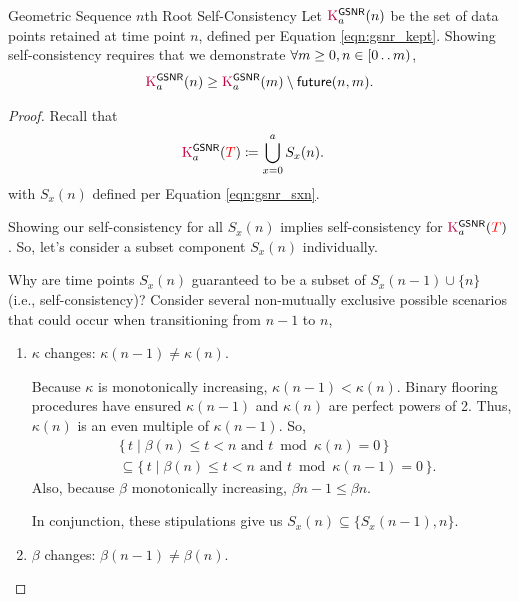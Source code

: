 \begin{theorem}{Geometric Sequence $n$th Root Self-Consistency}
\label{thm:geom-seq-nth-root-algo-self-consistency}
Let $\colorK^{\mathsf{GSNR}}_a(n)$ be the set of data points retained at time point $n$, defined per Equation \ref{eqn:gsnr_kept}.
Showing self-consistency requires that we demonstrate $\forall m \geq 0, n \in [0 \mathinner {\ldotp \ldotp} m)$,
\begin{align*}
\colorK^{\mathsf{GSNR}}_a(n)
\geq
\colorK^{\mathsf{GSNR}}_a(m)
\setminus
\mathsf{future}(n, m).
\end{align*}
\end{theorem}

\begin{proof}
\label{prf:geom-seq-nth-root-algo-self-consistency}
Recall that
\begin{align*}
  \colorK^{\mathsf{GSNR}}_{a}(\colorT)
  &\coloneq
  \bigcup_{x=0}^{a} S_x(n).
\end{align*}
with $S_x(n)$ defined per Equation \ref{eqn:gsnr_sxn}.

Showing our self-consistency for all $S_x(n)$ implies self-consistency for $\colorK^{\mathsf{GSNR}}_a(\colorT)$.
So, let's consider a subset component $S_x(n)$ individually.

Why are time points $S_x(n)$ guaranteed to be a subset of $S_x(n-1) \cup \{n\}$ (i.e., self-consistency)?
Consider several non-mutually exclusive possible scenarios that could occur when transitioning from $n - 1$ to $n$,
\begin{enumerate}
  \item $\kappa$ changes: $\kappa(n - 1) \neq \kappa(n)$.

  Because $\kappa$ is monotonically increasing, $\kappa(n - 1) < \kappa(n)$.
  Binary flooring procedures have ensured $\kappa(n - 1)$ and $\kappa(n)$ are perfect powers of 2.
  Thus, $\kappa(n)$ is an even multiple of $\kappa(n - 1)$.
  So,
  \begin{align*}
    &\{\, t \mid \beta(n) \leq t < n \text{ and } t \bmod \kappa(n) = 0 \,\}\\
    &\subseteq \{\, t \mid \beta(n) \leq t < n \text{ and } t \bmod \kappa(n - 1) = 0 \,\}.
  \end{align*}
  Also, because $\beta$ monotonically increasing, $\beta{n - 1} \leq \beta{n}$.

  In conjunction, these stipulations give us $S_x(n) \subseteq \{S_x(n - 1), n\}$.

  \item $\beta$ changes: $\beta(n - 1) \neq \beta(n)$.


\end{enumerate}
\end{proof}
